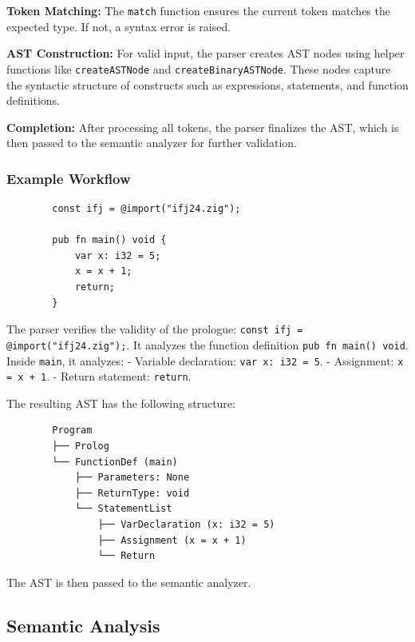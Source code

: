\documentclass[a4paper, 11pt]{article}
\begin{document}
        \textbf{Token Matching:}  
        The \texttt{match} function ensures the current token matches the expected type. If not, a syntax error is raised.
        
        \textbf{AST Construction:}  
        For valid input, the parser creates AST nodes using helper functions like \texttt{createASTNode} and \texttt{createBinaryASTNode}. These nodes capture the syntactic structure of constructs such as expressions, statements, and function definitions.
        
        \textbf{Completion:}  
        After processing all tokens, the parser finalizes the AST, which is then passed to the semantic analyzer for further validation.
        
        
        \subsubsection*{Example Workflow}
        
        \begin{verbatim}
        const ifj = @import("ifj24.zig");
        
        pub fn main() void {
            var x: i32 = 5; 
            x = x + 1;
            return;
        }
        \end{verbatim}
        
        The parser verifies the validity of the prologue: \texttt{const ifj = @import("ifj24.zig");}.  
        It analyzes the function definition \texttt{pub fn main() void}.  
        Inside \texttt{main}, it analyzes:  
        - Variable declaration: \texttt{var x: i32 = 5}.  
        - Assignment: \texttt{x = x + 1}.  
        - Return statement: \texttt{return}.  
        
        The resulting AST has the following structure:  
        
        \begin{verbatim}
        Program
        ├── Prolog
        └── FunctionDef (main)
            ├── Parameters: None
            ├── ReturnType: void
            └── StatementList
                ├── VarDeclaration (x: i32 = 5)
                ├── Assignment (x = x + 1)
                └── Return
        \end{verbatim}
        
        The AST is then passed to the semantic analyzer.

	\subsection{Semantic Analysis}
\end{document}
